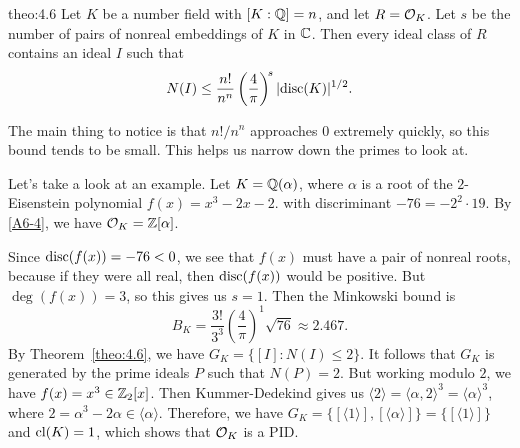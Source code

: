 \begin{theo}[Minkowski]{theo:4.6}
    Let $K$ be a number field with $[K : \mathbb{Q}] = n$, and let $R = {\cal O}_K$.
    Let $s$ be the number of pairs of nonreal embeddings of $K$ in $\mathbb{C}$. 
    Then every ideal class of $R$ contains an ideal $I$ such that 
    \[ N(I) \leq \frac{n!}{n^n} \left( \frac{4}{\pi} \right)^{\!s} \lvert\operatorname{disc}(K)\rvert^{1/2}. \]
\end{theo}\vspace{-0.25cm}

The main thing to notice is that $n!/n^n$ approaches $0$ extremely quickly, 
so this bound tends to be small. This helps us narrow down the 
primes to look at. 

Let's take a look at an example. Let $K = \mathbb{Q}(\alpha)$, where $\alpha$ 
is a root of the $2$-Eisenstein polynomial $f(x) = x^3 - 2x - 2$. 
with discriminant $-76 = -2^2 \cdot 19$. By \ref{A6-4}, we have 
${\cal O}_K = \mathbb{Z}[\alpha]$. 

Since $\operatorname{disc}(f(x)) = -76 < 0$, we see that $f(x)$ must have a pair of 
nonreal roots, because if they were all real, then $\operatorname{disc}(f(x))$ would 
be positive. But $\deg(f(x)) = 3$, so this gives us $s = 1$. 
Then the Minkowski bound is 
\[ B_K = \frac{3!}{3^3} \left( \frac{4}{\pi} \right)^{\!1} \sqrt{76} \approx 2.467. \] 
By Theorem~\ref{theo:4.6}, we have $G_K = \{[I] : N(I) \leq 2\}$.
It follows that $G_K$ is generated by the prime ideals $P$ such that $N(P) = 2$.
But working modulo $2$, we have $f(x) = x^3 \in \mathbb{Z}_2[x]$. Then Kummer-Dedekind 
gives us $\langle 2 \rangle = \langle \alpha, 2 \rangle^3 = \langle \alpha \rangle^3$, 
where $2 = \alpha^3 - 2\alpha \in \langle \alpha \rangle$. Therefore, 
we have $G_K = \{[\langle 1 \rangle], [\langle \alpha \rangle]\} = 
\{[\langle 1 \rangle]\}$ and $\operatorname{cl}(K) = 1$, which shows that ${\cal O}_K$ 
is a PID. 
